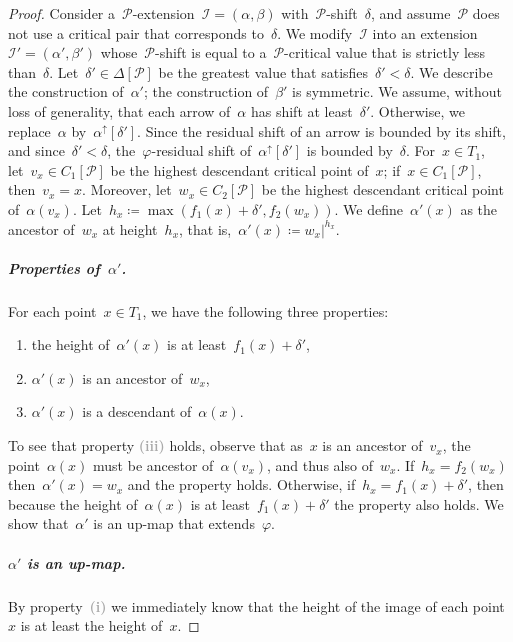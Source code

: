 \documentclass[11pt]{article}
\newtheorem{lemma}[theorem]{Lemma}
\newcommand{\an}[2]{#1|^{#2}}
\renewcommand{\phi}{\varphi}
\newcommand{\I}{\mathcal{I}}
\renewcommand{\P}{\mathcal{P}}
\newcommand{\enumit}[1]{\textcolor{darkgray}{\sffamily\bfseries\upshape\mathversion{bold}#1}}
\begin{document}
\begin{proof}
Consider a~$\P$-extension~$\I = (\alpha, \beta)$ with~$\P$-shift~$\delta$, and assume~$\P$ does not use a critical pair that corresponds to~$\delta$.
We modify~$\I$ into an extension~$\I' = (\alpha', \beta')$ whose~$\P$-shift is equal to a~$\P$-critical value that is strictly less than~$\delta$.
Let~$\delta' \in \Delta[\P]$ be the greatest value that satisfies~$\delta' < \delta$.
We describe the construction of~$\alpha'$; the construction of~$\beta'$ is symmetric.
%
We assume, without loss of generality, that each arrow of~$\alpha$ has shift at least~$\delta'$.
Otherwise, we replace~$\alpha$ by~$\alpha^\uparrow[\delta']$.
Since the residual shift of an arrow is bounded by its shift, and since~$\delta' < \delta$, the~$\phi$-residual shift of~$\alpha^\uparrow[\delta']$ is bounded by~$\delta$.
For~$x \in T_1$, let~$v_x \in C_1[\P]$ be the highest descendant critical point of~$x$; if~$x \in C_1[\P]$, then~$v_x = x$.
Moreover, let~$w_x \in C_2[\P]$ be the highest descendant critical point of~$\alpha(v_x)$.
Let~$h_x \coloneqq \max(f_1(x) + \delta', f_2(w_x))$.
We define~$\alpha'(x)$ as the ancestor of~$w_x$ at height~$h_x$, that is,~$\alpha'(x) \coloneqq \an{w_x}{h_x}$.
%
\subparagraph*{Properties of~$\alpha'$.}
For each point~$x \in T_1$, we have the following three properties:
\begin{enumerate}[label={(\roman*)}]
    \item the height of~$\alpha'(x)$ is at least~$f_1(x) + \delta'$,
    \item $\alpha'(x)$ is an ancestor of~$w_x$,
    \item $\alpha'(x)$ is a descendant of~$\alpha(x)$.
\end{enumerate}
To see that property \enumit{(iii)} holds, observe that as~$x$ is an ancestor of~$v_x$, the point~$\alpha(x)$ must be ancestor of~$\alpha(v_x)$, and thus also of~$w_x$.
If~$h_x = f_2(w_x)$ then~$\alpha'(x) = w_x$ and the property holds.
Otherwise, if~$h_x = f_1(x) + \delta'$, then because the height of~$\alpha(x)$ is at least~$f_1(x) + \delta'$ the property also holds.
We show that~$\alpha'$ is an up-map that extends~$\phi$.
%
\subparagraph*{$\alpha'$ is an up-map.}
By property~\enumit{(i)} we immediately know that the height of the image of each point~$x$ is at least the height of~$x$.

\end{proof}
\end{document}
